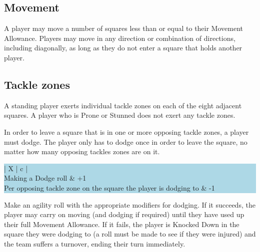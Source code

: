 \documentclass{article}
\begin{document}
\begin{multicols}{2}
\subsection{Movement}
\par A player may move a number of squares less than or equal to their Movement Allowance. Players may move in any direction or combination of directions, including diagonally, as long as they do not enter a square that holds another player.

\subsection{Tackle zones}
\par A standing player exerts individual tackle zones on each of the eight adjacent squares. A player who is Prone or Stunned does not exert any tackle zones.
\par In order to leave a square that is in one or more opposing tackle zones, a player must dodge. The player only has to dodge once in order to leave the square, no matter how many opposing tackles zones are on it.

\medskip
\begingroup\setlength{\fboxsep}{0pt}\colorbox{lightBlue}{%
\begin{tabularx}{\linewidth}{ | X | c | }
\hline
{} \\
\hline
Making a Dodge roll & +1 \\
\hline
Per opposing tackle zone on the square the player is dodging to & -1 \\
\hline
\end{tabularx}%
}\endgroup
\medskip

\par Make an agility roll with the appropriate modifiers for dodging. If it succeeds, the player may carry on moving (and dodging if required) until they have used up their full Movement Allowance. If it fails, the player is Knocked Down in the square they were dodging to (a roll must be made to see if they were injured) and the team suffers a turnover, ending their turn immediately.


\end{multicols}
\end{document}
